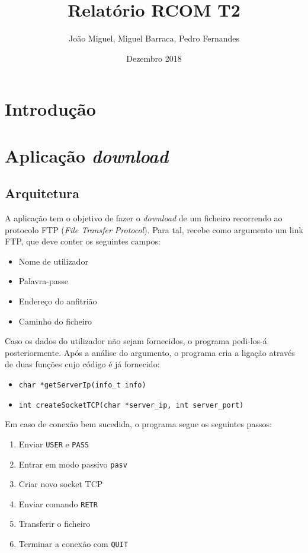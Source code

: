 \documentclass{article}
\title{Relatório RCOM T2}
\author{João Miguel, Miguel Barraca, Pedro Fernandes}
\date{Dezembro 2018}
\begin{document}
\maketitle

\tableofcontents

\section{Introdução}
\section{Aplicação \textit{download}}
\subsection{Arquitetura}

A aplicação tem o objetivo de fazer o \textit{download} de um ficheiro recorrendo ao protocolo
FTP (\textit{File Transfer Protocol}). Para tal, recebe como argumento um link FTP, que deve conter
os seguintes campos:

\begin{itemize}
\item Nome de utilizador
\item Palavra-passe
\item Endereço do anfitrião
\item Caminho do ficheiro
\end{itemize}

Caso os dados do utilizador não sejam fornecidos, o programa pedi-los-á posteriormente.
Após a análise do argumento, o programa cria a ligação através de duas funções cujo código 
é já fornecido:

\begin{itemize}
\item \texttt{char *getServerIp(info_t info)}
\item \texttt{int createSocketTCP(char *server_ip, int server_port)}
\end{itemize}

Em caso de conexão bem sucedida, o programa segue os seguintes passos:
\begin{enumerate}
\item Enviar \texttt{USER} e \texttt{PASS}
\item Entrar em modo passivo \texttt{pasv}
\item Criar novo socket TCP
\item Enviar comando \texttt{RETR}
\item Transferir o ficheiro
\item Terminar a conexão com \texttt{QUIT}
\end{enumerate}
\end{document}

